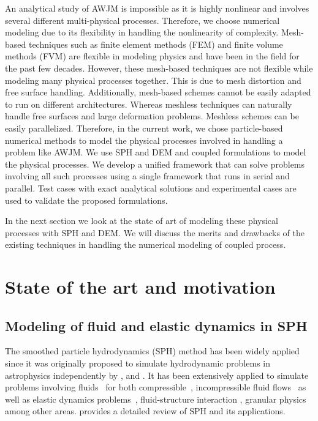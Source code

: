 An analytical study of AWJM is impossible as it is highly nonlinear and involves
several different multi-physical processes. Therefore, we choose numerical
modeling due to its flexibility in handling the nonlinearity of complexity.
Mesh-based techniques such as finite element methods (FEM) and finite volume
methods (FVM) are flexible in modeling physics and have been in the field for
the past few decades. However, these mesh-based techniques are not flexible
while modeling many physical processes together. This is due to mesh distortion
and free surface handling. Additionally, mesh-based schemes cannot be easily
adapted to run on different architectures. Whereas meshless techniques can
naturally handle free surfaces and large deformation problems. Meshless schemes
can be easily parallelized. Therefore, in the current work, we chose
particle-based numerical methods to model the physical processes involved in
handling a problem like AWJM. We use SPH and DEM and coupled formulations to
model the physical processes. We develop a unified framework that can solve
problems involving all such processes using a single framework that runs in
serial and parallel. Test cases with exact analytical solutions and experimental
cases are used to validate the proposed formulations.



In the next section we look at the state of art of modeling these physical
processes with SPH and DEM. We will discuss the merits and drawbacks of the
existing techniques in handling the numerical modeling of coupled process.

\section{State of the art and motivation}
\subsection{Modeling of fluid and elastic dynamics in SPH}
The smoothed particle hydrodynamics (SPH) method has been widely applied since
it was originally proposed to simulate hydrodynamic problems in astrophysics
independently by \citet{lucy77}, and \citet{monaghan-gingold-stars-mnras-77}. It
has been extensively applied to simulate problems involving
fluids~\citep{dalrymple2001sph,shao2003incompressible} for both
compressible~\citep{monaghan-review:2005}, incompressible fluid
flows~\citep{sph:fsf:monaghan-jcp94,sph:psph:cummins-rudman:jcp:1999} as well as
elastic dynamics problems~\citep{randles-1996,gray-ed-2001}, fluid-structure
interaction \citep{khayyer2018enhanced,he2017coupled}, granular physics
\citep{bui2008lagrangian,bui2021smoothed} among other areas.
\cite{monaghan2012smoothed} provides a detailed review of SPH and its
applications.

